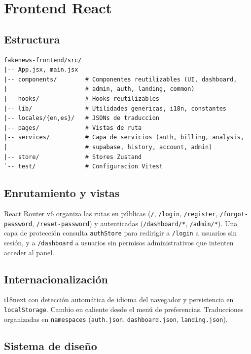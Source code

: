 \chapter{Frontend React}\label{cap:frontend}

\section{Estructura}

\begin{lstlisting}[caption={Layout del frontend}]
fakenews-frontend/src/
|-- App.jsx, main.jsx
|-- components/        # Componentes reutilizables (UI, dashboard,
|                      # admin, auth, landing, common)
|-- hooks/             # Hooks reutilizables
|-- lib/               # Utilidades genericas, i18n, constantes
|-- locales/{en,es}/   # JSONs de traduccion
|-- pages/             # Vistas de ruta
|-- services/          # Capa de servicios (auth, billing, analysis,
|                      # supabase, history, account, admin)
|-- store/             # Stores Zustand
`-- test/              # Configuracion Vitest
\end{lstlisting}

\section{Enrutamiento y vistas}

React Router v6 organiza las rutas en públicas (\texttt{/},
\texttt{/login}, \texttt{/register}, \texttt{/forgot-password},
\texttt{/reset-password}) y autenticadas (\texttt{/dashboard/*},
\texttt{/admin/*}). Una capa de protección consulta
\texttt{authStore} para redirigir a \texttt{/login} a usuarios sin
sesión, y a \texttt{/dashboard} a usuarios sin permisos
administrativos que intenten acceder al panel.

\section{Internacionalización}

i18next con detección automática de idioma del navegador y persistencia
en \texttt{localStorage}. Cambio en caliente desde el menú de
preferencias. Traducciones organizadas en \texttt{namespaces}
(\texttt{auth.json}, \texttt{dashboard.json}, \texttt{landing.json}).

\section{Sistema de diseño}

